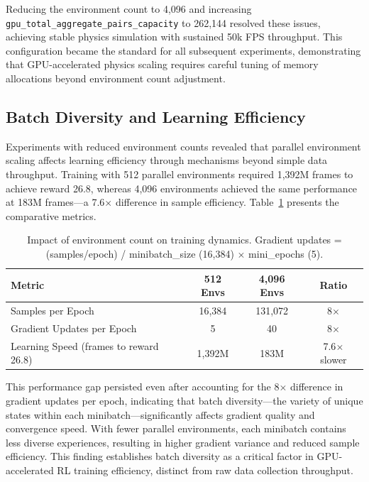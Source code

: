 \documentclass[12pt,a4paper,oneside]{report}
\begin{document}
Reducing the environment count to 4,096 and increasing \texttt{gpu\_total\_aggregate\_pairs\_capacity} to 262,144 resolved these issues, achieving stable physics simulation with sustained 50k FPS throughput. This configuration became the standard for all subsequent experiments, demonstrating that GPU-accelerated physics scaling requires careful tuning of memory allocations beyond environment count adjustment.

\subsection{Batch Diversity and Learning Efficiency}

Experiments with reduced environment counts revealed that parallel environment scaling affects learning efficiency through mechanisms beyond simple data throughput. Training with 512 parallel environments required 1,392M frames to achieve reward 26.8, whereas 4,096 environments achieved the same performance at 183M frames---a 7.6$\times$ difference in sample efficiency. Table~\ref{tab:env_scaling_analysis} presents the comparative metrics.

\begin{table}[h]
\centering
\begin{tabular}{|l|c|c|c|}
\hline
\textbf{Metric} & \textbf{512 Envs} & \textbf{4{,}096 Envs} & \textbf{Ratio} \\
\hline
Samples per Epoch & 16{,}384 & 131{,}072 & 8$\times$ \\
Gradient Updates per Epoch & 5 & 40 & 8$\times$ \\
Learning Speed (frames to reward 26.8) & 1{,}392M & 183M & 7.6$\times$ slower \\
\hline
\end{tabular}
\caption{Impact of environment count on training dynamics. Gradient updates = (samples/epoch) / minibatch\_size (16{,}384) $\times$ mini\_epochs (5).}
\label{tab:env_scaling_analysis}
\end{table}

This performance gap persisted even after accounting for the 8$\times$ difference in gradient updates per epoch, indicating that batch diversity---the variety of unique states within each minibatch---significantly affects gradient quality and convergence speed. With fewer parallel environments, each minibatch contains less diverse experiences, resulting in higher gradient variance and reduced sample efficiency. This finding establishes batch diversity as a critical factor in GPU-accelerated RL training efficiency, distinct from raw data collection throughput.
\end{document}
